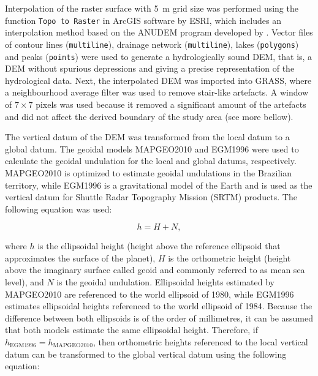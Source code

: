 
Interpolation of the raster surface with \SI{5}{\metre} grid size was performed using the function 
\texttt{Topo 
to Raster} in ArcGIS\textregistered{} software by ESRI, which includes an interpolation method based on the 
ANUDEM program developed by . Vector files of contour lines (\texttt{multiline}), 
drainage network (\texttt{multiline}), lakes (\texttt{polygons}) and peaks (\texttt{points}) were used to 
generate a 
hydrologically sound DEM, that is, a DEM without spurious depressions and giving a precise representation 
of the hydrological data. Next, the interpolated DEM was imported into GRASS, where a neighbourhood average 
filter was used to remove stair-like artefacts. A window of $7 \times 7$ pixels was used because it removed a 
significant amount of the artefacts and did not affect the derived boundary of the study area (see more 
bellow).

The vertical datum of the DEM was transformed from the local datum to a global datum. The geoidal models 
MAPGEO2010 \cite{IBGE2010a} and EGM1996 \cite{LemoineEtAl1998} were used to calculate the geoidal undulation 
for the local and global datums, respectively. MAPGEO2010 is optimized to estimate geoidal undulations in the 
Brazilian territory, while EGM1996 is a gravitational model of the Earth and is used as the vertical datum for 
Shuttle Radar Topography Mission (SRTM) products. The following equation was used:

\begin{equation}
 h = H + N,
\end{equation}\label{eqn:geoidal}

\noindent where $h$ is the ellipsoidal height (height above the reference ellipsoid that approximates the 
surface of the planet), $H$ is the orthometric height (height above the imaginary surface called geoid and 
commonly referred to as mean sea level), and $N$ is the geoidal undulation. Ellipsoidal heights estimated by 
MAPGEO2010 are referenced to the world ellipsoid of 1980, while EGM1996 estimates ellipsoidal heights 
referenced to the world ellipsoid of 1984. Because the difference between both ellipsoids is of the order of 
millimetres, it can be assumed that both models estimate the same ellipsoidal height. Therefore, if 
$h_{\text{EGM1996}} = h_{\text{MAPGEO2010}}$, then orthometric heights referenced to the local vertical datum 
can be transformed to the global vertical datum using the following equation:

